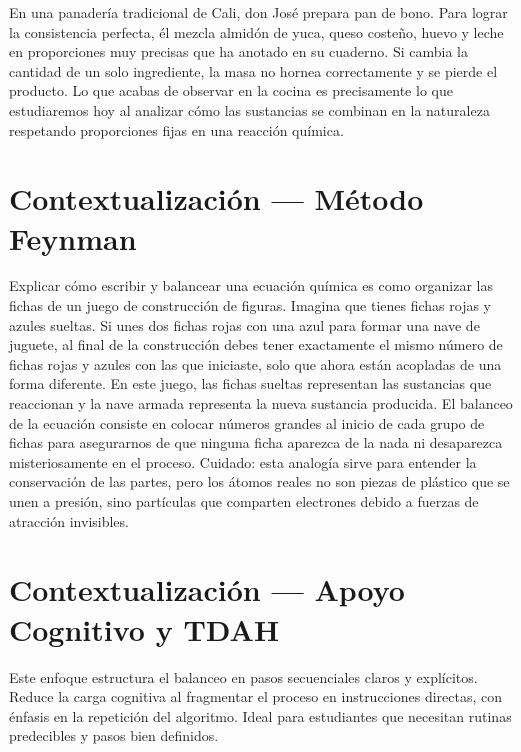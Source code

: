 \documentclass[
  spanish,
  letterpaper,
  12pt,
  oneside,
  open=any]{scrbook}
\newcommand{\setcolorsection}[2]{%
  \definecolor{currentsectionbg}{HTML}{#1}%
  \definecolor{currentsectionborder}{HTML}{#2}%
}
\begin{document}
En una panadería tradicional de Cali, don José prepara pan de bono. Para
lograr la consistencia perfecta, él mezcla almidón de yuca, queso
costeño, huevo y leche en proporciones muy precisas que ha anotado en su
cuaderno. Si cambia la cantidad de un solo ingrediente, la masa no
hornea correctamente y se pierde el producto. Lo que acabas de observar
en la cocina es precisamente lo que estudiaremos hoy al analizar cómo
las sustancias se combinan en la naturaleza respetando proporciones
fijas en una reacción química.

\setcolorsection{f2c6a0}{e0b088}

\section{Contextualización --- Método
Feynman}\label{contextualizaciuxf3n-muxe9todo-feynman-1}

Explicar cómo escribir y balancear una ecuación química es como
organizar las fichas de un juego de construcción de figuras. Imagina que
tienes fichas rojas y azules sueltas. Si unes dos fichas rojas con una
azul para formar una nave de juguete, al final de la construcción debes
tener exactamente el mismo número de fichas rojas y azules con las que
iniciaste, solo que ahora están acopladas de una forma diferente. En
este juego, las fichas sueltas representan las sustancias que reaccionan
y la nave armada representa la nueva sustancia producida. El balanceo de
la ecuación consiste en colocar números grandes al inicio de cada grupo
de fichas para asegurarnos de que ninguna ficha aparezca de la nada ni
desaparezca misteriosamente en el proceso. Cuidado: esta analogía sirve
para entender la conservación de las partes, pero los átomos reales no
son piezas de plástico que se unen a presión, sino partículas que
comparten electrones debido a fuerzas de atracción invisibles.

\setcolorsection{d6c7e7}{c0b0d8}

\section{Contextualización --- Apoyo Cognitivo y
TDAH}\label{contextualizaciuxf3n-apoyo-cognitivo-y-tdah}

Este enfoque estructura el balanceo en pasos secuenciales claros y
explícitos. Reduce la carga cognitiva al fragmentar el proceso en
instrucciones directas, con énfasis en la repetición del algoritmo.
Ideal para estudiantes que necesitan rutinas predecibles y pasos bien
definidos.
\end{document}
